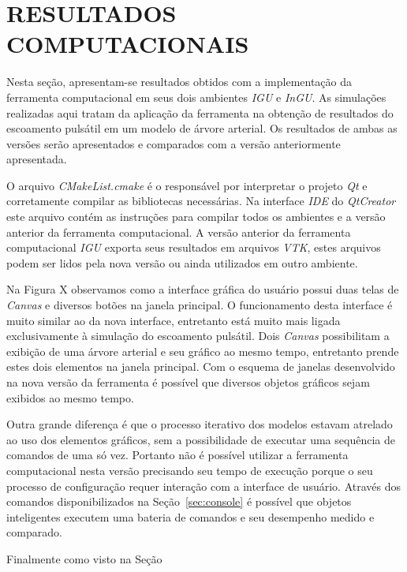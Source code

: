 \chapter{RESULTADOS COMPUTACIONAIS}\label{sec:resultados2}

Nesta seção, apresentam-se resultados obtidos com a implementação da ferramenta computacional em seus dois ambientes \textit{IGU} e \textit{InGU}. As simulações realizadas aqui tratam da aplicação da ferramenta na obtenção de resultados do escoamento pulsátil em um modelo de árvore arterial. Os resultados de ambas as versões serão apresentados e comparados com a versão anteriormente apresentada.

O arquivo \textit{CMakeList.cmake} é o responsável por interpretar o projeto \textit{Qt} e corretamente compilar as bibliotecas necessárias. Na interface \textit{IDE} do \textit{QtCreator} este arquivo contém as instruções para compilar todos os ambientes e a versão anterior da ferramenta computacional. A versão anterior da ferramenta computacional \textit{IGU} exporta seus resultados em arquivos \textit{VTK}, estes arquivos podem ser lidos pela nova versão ou ainda utilizados em outro ambiente.

Na Figura X observamos como a interface gráfica do usuário possui duas telas de \textit{Canvas} e diversos botões na janela principal. O funcionamento desta interface é muito similar ao da nova interface, entretanto está muito mais ligada exclusivamente à simulação do escoamento pulsátil. Dois \textit{Canvas} possibilitam a exibição de uma árvore arterial e seu gráfico ao mesmo tempo, entretanto prende estes dois elementos na janela principal. Com o esquema de janelas desenvolvido na nova versão da ferramenta é possível que diversos objetos gráficos sejam exibidos ao mesmo tempo.

Outra grande diferença é que o processo iterativo dos modelos estavam atrelado ao uso dos elementos gráficos, sem a possibilidade de executar uma sequência de comandos de uma só vez. Portanto não é possível utilizar a ferramenta computacional nesta versão precisando seu tempo de execução porque o seu processo de configuração requer interação com a interface de usuário. Através dos comandos disponibilizados na Seção~\ref{sec:console} é possível que objetos inteligentes executem uma bateria de comandos e seu desempenho medido e comparado.

Finalmente como visto na Seção 